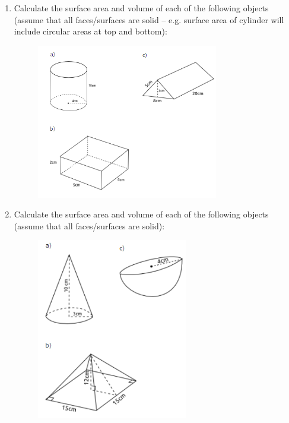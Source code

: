 \begin{enumerate}[noitemsep, label=\textbf{\arabic*}. ]
\begin{figure}[H]
\begin{center}
\end{center}
\end{figure}              \item Calculate the surface area and volume of each of the following objects (assume that all faces/surfaces are solid -- e.g. surface area of cylinder will include circular areas at top and bottom):
\setcounter{subfigure}{0}
\begin{figure}[H] %
\begin{center}
\label{m39358*id320601!!!underscore!!!media}\label{m39358*id320601!!!underscore!!!printimage}\includegraphics[width=300px]{col11306.imgs/m39358_MG10C14_042.png} %
\vspace{2pt}
\vspace{.1in}
\end{center}
\end{figure}              \item Calculate the surface area and volume of each of the following objects (assume that all faces/surfaces are solid):
\setcounter{subfigure}{0}
\begin{figure}[H] %
\begin{center}
\label{m39358*id320602!!!underscore!!!media}\label{m39358*id320602!!!underscore!!!printimage}\includegraphics[height=300px]{col11306.imgs/m39358_MG10C14_043.png} %

\end{center}
\end{figure}
\end{enumerate}
